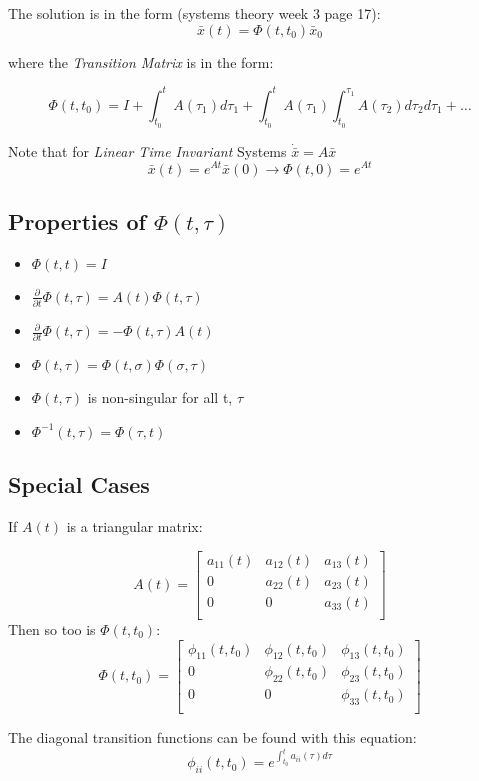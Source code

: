\documentclass[12pt]{article}
\begin{document}
\noindent
The solution is in the form (systems theory week 3 page 17):
$$\bar{x}(t)=\Phi(t,t_0)\bar{x}_0$$

\noindent
where the {\em Transition Matrix} is in the form:

$$ \Phi(t,t_0) = I + \int_{t_0}^t A(\tau_1)d\tau_1+\int_{t_0}^tA(\tau_1)\int_{t_0}^{\tau_1}A(\tau_2)d\tau_2d\tau_1+\dots$$

\noindent
Note that for {\em Linear Time Invariant} Systems $\dot{\bar{x}}=A\bar{x}$ 
$$\bar{x}(t)=e^{At}\bar{x}(0)\rightarrow \Phi(t,0)=e^{At}$$

\subsection*{Properties of $ \Phi(t,\tau)$}

\begin{itemize}
	\item $\Phi(t,t) = I$
	\item $\frac{\partial}{\partial t}\Phi(t,\tau)=A(t)\Phi(t,\tau)$
	\item $\frac{\partial}{\partial t}\Phi(t,\tau)=-\Phi(t,\tau)A(t)$
	\item $\Phi(t,\tau)=\Phi(t,\sigma)\Phi(\sigma,\tau)$
	\item $\Phi(t,\tau)$ is non-singular for all t, $\tau$
	\item $\Phi^{-1}(t,\tau)=\Phi(\tau,t)$
\end{itemize}

\subsection*{Special Cases}
If $A(t)$ is a triangular matrix:

$$ A(t) = 
\begin{bmatrix}
a_{11}(t) & a_{12}(t) & a_{13}(t) \\
0 & a_{22}(t) & a_{23}(t) \\
0 & 0& a_{33}(t)\\
\end{bmatrix}
$$
Then so too is $\Phi(t,t_0)$:
$$\Phi(t,t_0) = 
\begin{bmatrix}
\phi_{11}(t,t_0) & \phi_{12}(t,t_0) & \phi_{13}(t,t_0)\\
0 & \phi_{22}(t,t_0) & \phi_{23}(t,t_0) \\
0 & 0 & \phi_{33}(t,t_0)\\
\end{bmatrix}
$$

\noindent
The diagonal transition functions can be found with this equation:
$$\phi_{ii}(t,t_0)=e^{\int_{t_0}^ta_{ii}(\tau)d\tau}$$
\end{document}
